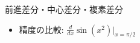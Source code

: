 \begin{frame}[t,fragile]{前進差分・中心差分・複素差分}
  \begin{itemize}
  \item 精度の比較: $\frac{d}{dx} \sin(x^2) |_{x=\pi/2}$
    \begin{center}
    \end{center}
  \end{itemize}
\end{frame}
